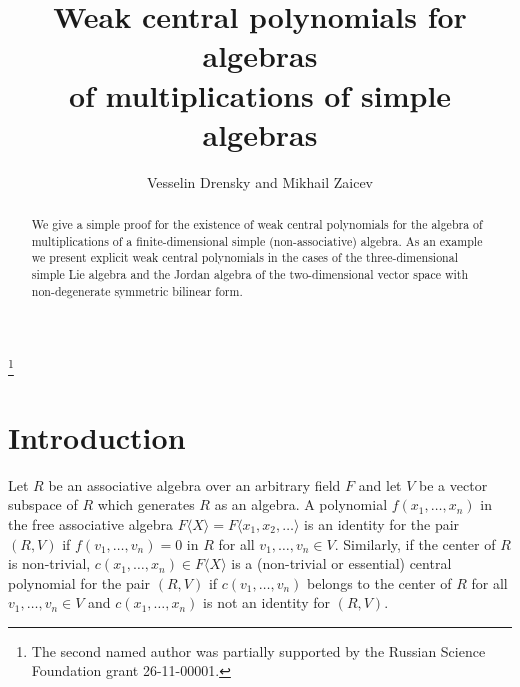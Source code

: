 \documentclass[10]{amsart}
\theoremstyle{definition}
\begin{document}
\title[Weak central polynomials for multiplications of simple algebras]
{Weak central polynomials for algebras\\
of multiplications of simple algebras}

\author[Vesselin Drensky and Mikhail Zaicev]
{Vesselin Drensky and Mikhail Zaicev}
\address{Institute of Mathematics and Informatics,
Bulgarian Academy of Sciences,
Acad. G. Bonchev Str., Block 8,
1113 Sofia, Bulgaria}
\address{Department of Algebra, Faculty of Mathematics and Mechanics, Moscow State University, Moscow 119992, Russia}
\address{Moscow Center of Fundamental and Applied Mathematics, Moscow, 119991, Russia}




\thanks{The second named author was partially supported by the Russian Science Foundation grant 26-11-00001.}



\begin{abstract} We give a simple proof for the existence of weak central polynomials for the algebra of
multiplications of a finite-dimensional simple (non-associative) algebra. As an example we present explicit weak central polynomials
in the cases of the three-dimensional simple Lie algebra and the Jordan algebra of the two-dimensional vector space with non-degenerate symmetric bilinear form.
\end{abstract}

\maketitle

\section{Introduction}
Let $R$ be an associative algebra over an arbitrary field $F$ and let $V$ be a vector subspace of $R$ which generates $R$ as an algebra.
A polynomial $f(x_1,\ldots,x_n)$ in the free associative algebra $F\langle X\rangle=F\langle x_1,x_2,\ldots\rangle$ is an identity for the pair
$(R,V)$ if $f(v_1,\ldots,v_n)=0$ in $R$ for all $v_1,\ldots,v_n\in V$. Similarly, if the center of $R$ is non-trivial, $c(x_1,\ldots,x_n)\in F\langle X\rangle$ is
a (non-trivial or essential) central polynomial for the pair $(R,V)$ if $c(v_1,\ldots,v_n)$ belongs to the center of $R$ for all $v_1,\ldots,v_n\in V$
and $c(x_1,\ldots,x_n)$ is not an identity for $(R,V)$.
\end{document}
